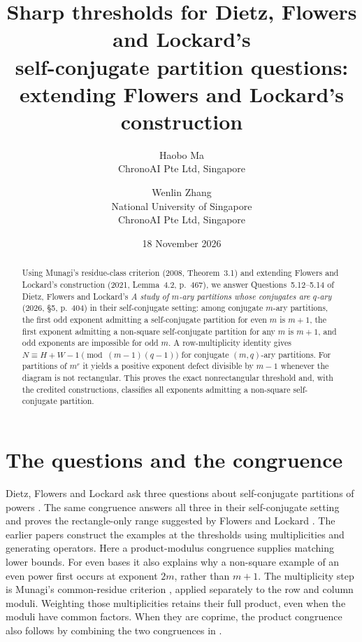 \documentclass[11pt]{article}
\title{Sharp thresholds for Dietz, Flowers and Lockard's\\self-conjugate partition questions:\\extending Flowers and Lockard's construction}
\author{Haobo Ma\\\small ChronoAI Pte Ltd, Singapore
\and Wenlin Zhang\\\small National University of Singapore\\\small ChronoAI Pte Ltd, Singapore}
\date{18 November 2026}
\begin{document}
\maketitle
\begin{abstract}
Using Munagi's residue-class criterion (2008, Theorem~3.1) and extending
Flowers and Lockard's construction (2021, Lemma~4.2, p.~467),
we answer Questions~5.12--5.14 of Dietz, Flowers and Lockard's
\emph{A study of $m$-ary partitions whose conjugates are $q$-ary}
(2026, \S5, p.~404) in their self-conjugate setting: among conjugate
$m$-ary partitions, the first odd exponent admitting a self-conjugate
partition for even $m$ is $m+1$, the first exponent admitting a
non-square self-conjugate partition for any $m$ is $m+1$, and odd
exponents are impossible for odd $m$.
A row-multiplicity identity gives
$N\equiv H+W-1\pmod{(m-1)(q-1)}$ for conjugate $(m,q)$-ary partitions.
For partitions of $m^r$ it yields a positive exponent defect divisible
by $m-1$ whenever the diagram is not rectangular. This proves the exact
nonrectangular threshold and, with the credited constructions, classifies
all exponents admitting a non-square self-conjugate partition.
\end{abstract}

\section{The questions and the congruence}
Dietz, Flowers and Lockard ask three questions about self-conjugate
partitions of powers \cite[Questions~5.12--5.14, p.~404]{DFL}.
The same congruence answers all three in their self-conjugate setting
and proves the rectangle-only range suggested by Flowers and Lockard
\cite[\S4, pp.~466--467]{FL}. The earlier papers construct the examples
at the thresholds using multiplicities and generating operators.
Here a product-modulus congruence supplies matching lower bounds.
For even bases it also explains why a non-square example of an even
power first occurs at exponent $2m$, rather than $m+1$.
The multiplicity step is Munagi's common-residue criterion
\cite[Theorem~3.1, p.~2494]{Munagi}, applied separately to the row and
column moduli. Weighting those multiplicities retains their full product,
even when the moduli have common factors. When they are coprime,
the product congruence also follows by combining the two congruences in
\cite[Lemma~4.1(2)--(3), p.~397]{DFL}.
\end{document}
